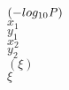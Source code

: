 \documentclass[11pt, letterpaper]{article}
\begin{document}
$(-log_{10}{\it P})$\\
$x_1$\\
$y_1$\\
$x_2$\\
$y_2$\\
$\left(\xi\right)$\\
$\xi$
\end{document}
